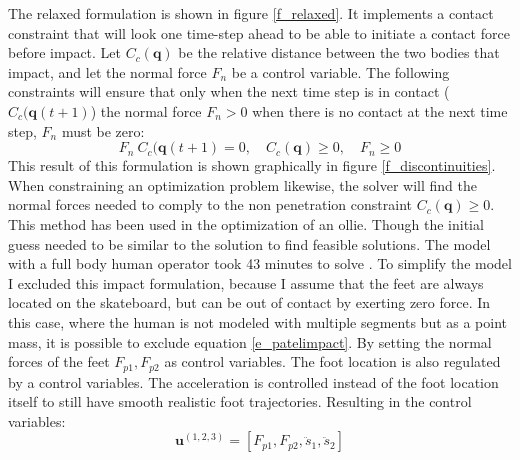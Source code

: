The relaxed formulation is shown in figure \ref{f_relaxed}. It implements a contact constraint that will look one time-step ahead to be able to initiate a contact force before impact. Let $C_c(\mathbf{q})$ be the relative distance between the two bodies that impact, and let the normal force $F_n$ be a control variable. The following constraints will ensure that only when the next time step is in contact ($C_c(\mathbf{q}(t+1)$) the normal force $F_n > 0$ when there is no contact at the next time step, $F_n$ must be zero:
\begin{equation}\label{e_patelimpact}
    F_n\ C_c(\mathbf{q}(t+1) = 0,\quad C_c(\mathbf{q}) \geq 0,\quad F_n \geq 0
\end{equation}
This result of this formulation is shown graphically in figure \ref{f_discontinuities}. When constraining an optimization problem likewise, the solver will find the normal forces needed to comply to the non penetration constraint $C_c(\mathbf{q}) \geq 0$. This method has been used in the optimization of an ollie. Though the initial guess needed to be similar to the solution to find feasible solutions. The model with a full body human operator took 43 minutes to solve \cite{shield_contact-implicit_2022}. 
To simplify the model I excluded this impact formulation, because I assume that the feet are always located on the skateboard, but can be out of contact by exerting zero force. In this case, where the human is not modeled with multiple segments but as a point mass, it is possible to exclude equation \ref{e_patelimpact}. By setting the normal forces of the feet $F_{p1},F_{p2}$ as control variables. The foot location is also regulated by a control variables. The acceleration is controlled instead of the foot location itself to still have smooth realistic foot trajectories. Resulting in the control variables:
\begin{equation}
    \mathbf{u}^{(1,2,3)} = [F_{p1},F_{p2},\ddot s_1, \ddot s_2]    
\end{equation}

